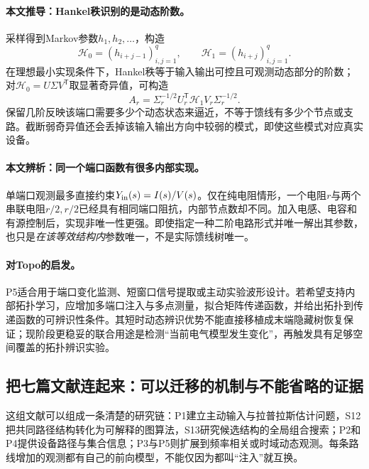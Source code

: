 \documentclass[UTF8,11pt,fontset=fandol]{ctexart}
\theoremstyle{remark}
\numberwithin{equation}{section}
\begin{document}
\paragraph{本文推导：Hankel秩识别的是动态阶数。}
采样得到Markov参数$h_1,h_2,\ldots$，构造
\begin{equation}
 \mathcal H_0=(h_{i+j-1})_{i,j=1}^{q},\qquad
 \mathcal H_1=(h_{i+j})_{i,j=1}^{q}.
 \label{eq:p5-hankel}
\end{equation}
在理想最小实现条件下，Hankel秩等于输入输出可控且可观测动态部分的阶数；对$\mathcal H_0=U\Sigma V^{\mathsf T}$取显著奇异值，可构造
\begin{equation}
 A_r=\Sigma_r^{-1/2}U_r^{\mathsf T}\mathcal H_1V_r\Sigma_r^{-1/2}.
 \label{eq:p5-era}
\end{equation}
保留几阶反映该端口需要多少个动态状态来逼近，不等于馈线有多少个节点或支路。截断弱奇异值还会丢掉该输入输出方向中较弱的模式，即使这些模式对应真实设备。

\paragraph{本文辨析：同一个端口函数有很多内部实现。}
单端口观测最多直接约束$Y_{\rm in}(s)=I(s)/V(s)$。仅在纯电阻情形，一个电阻$r$与两个串联电阻$r/2,r/2$已经具有相同端口阻抗，内部节点数却不同。加入电感、电容和有源控制后，实现非唯一性更强。即使指定一种二阶电路形式并唯一解出其参数，也只是\emph{在该等效结构内}参数唯一，不是实际馈线树唯一。

\paragraph{对Topo的启发。}
P5适合用于端口变化监测、短窗口信号提取或主动实验波形设计。若希望支持内部拓扑学习，应增加多端口注入与多点测量，拟合矩阵传递函数，并给出拓扑到传递函数的可辨识性条件。其短时动态辨识优势不能直接移植成末端隐藏树恢复保证；现阶段更稳妥的联合用途是检测“当前电气模型发生变化”，再触发具有足够空间覆盖的拓扑辨识实验。

\subsection{把七篇文献连起来：可以迁移的机制与不能省略的证据}

这组文献可以组成一条清楚的研究链：P1建立主动输入与拉普拉斯估计问题，S12把共同路径结构转化为可解释的图算法，S13研究候选结构的全局组合搜索；P2和P4提供设备路径与集合信息；P3与P5则扩展到频率相关或时域动态观测。每条路线增加的观测都有自己的前向模型，不能仅因为都叫“注入”就互换。
\end{document}
